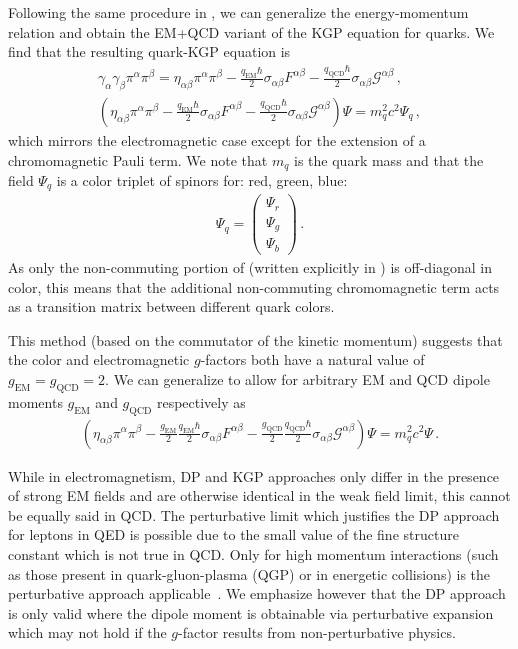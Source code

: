 Following the same procedure in , we can generalize the energy-momentum relation and obtain the EM+QCD variant of the KGP equation for quarks. We find that the resulting quark-KGP equation is
\begin{align}
    \label{eq:spin:11a}
    \gamma_{\alpha}\gamma_{\beta}\pi^{\alpha}\pi^{\beta} = \eta_{\alpha\beta}\pi^{\alpha}\pi^{\beta} - 
    \frac{q_\mathrm{EM}\hbar}{2}\sigma_{\alpha\beta}F^{\alpha\beta} - 
    \frac{q_\mathrm{QCD}\hbar}{2}\sigma_{\alpha\beta}\mathcal{G}^{\alpha\beta}\,,\\
	\label{eq:spin:11b} \left(\eta_{\alpha\beta}\pi^{\alpha}\pi^{\beta} - 
    \frac{q_\mathrm{EM}\hbar}{2}\sigma_{\alpha\beta}F^{\alpha\beta} - 
    \frac{q_\mathrm{QCD}\hbar}{2}\sigma_{\alpha\beta}\mathcal{G}^{\alpha\beta}\right)\Psi=m_{q}^{2}c^{2}\Psi_{q}\,,
\end{align}
which mirrors the electromagnetic case except for the extension of a chromomagnetic Pauli term. We note that $m_{q}$ is the quark mass and that the field $\Psi_{q}$ is a color triplet of spinors for: red, green, blue:
\begin{align}
    \Psi_{q}=
    \begin{pmatrix}
        \Psi_{r}\\
        \Psi_{g}\\
        \Psi_{b}
    \end{pmatrix}\,.
\end{align}
As only the non-commuting portion of  (written explicitly in ) is off-diagonal in color, this means that the additional non-commuting chromomagnetic term acts as a transition matrix between different quark colors.

This method (based on the commutator of the kinetic momentum) suggests that the color and electromagnetic $g$-factors both have a natural value of $g_\mathrm{EM}\!=\!g_\mathrm{QCD}\!=\!2$. We can generalize  to allow for arbitrary EM and QCD dipole moments $g_\mathrm{EM}$ and $g_\mathrm{QCD}$ respectively as
\begin{align}
	\label{eq:spin:12}
    \boxed{\left(\eta_{\alpha\beta}\pi^{\alpha}\pi^{\beta}-\frac{g_\mathrm{EM}}{2}\frac{q_\mathrm{EM}\hbar}{2}\sigma_{\alpha\beta}F^{\alpha\beta}-\frac{g_\mathrm{QCD}}{2}\frac{q_\mathrm{QCD}\hbar}{2}\sigma_{\alpha\beta}\mathcal{G}^{\alpha\beta}\right)\Psi=m_{q}^{2}c^{2}\Psi}\,.
\end{align}


While in electromagnetism, DP and KGP approaches only differ in the presence of strong EM fields and are otherwise identical in the weak field limit, this cannot be equally said in QCD. The perturbative limit which justifies the DP approach for leptons in QED is possible due to the small value of the fine structure constant which is not true in QCD. Only for high momentum interactions (such as those present in quark-gluon-plasma (QGP) or in energetic collisions) is the perturbative approach applicable~\citep{Choudhury:2014lna}. We emphasize however that the DP approach is only valid where the dipole moment is obtainable via perturbative expansion which may not hold if the $g$-factor results from non-perturbative physics.

